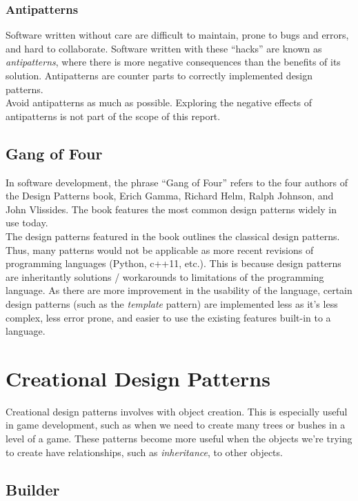 \documentclass[10pt,letterpaper]{article}
\newcommand{\bs}{\bigskip}
\begin{document}
\begin{multicols}{2}
\subsubsection{Antipatterns}
Software written without care are difficult to maintain, prone to bugs and errors, and hard to collaborate. Software written with these ``hacks'' are known as \textit{antipatterns}, where there is more negative consequences than the benefits of its solution. Antipatterns are counter parts to correctly implemented design patterns.\cite{sm-antipatterns}\bs
\\
Avoid antipatterns as much as possible. Exploring the negative effects of antipatterns is not part of the scope of this report.

\subsection{Gang of Four}

In software development, the phrase ``Gang of Four'' refers to the four authors of the Design Patterns book, Erich Gamma, Richard Helm, Ralph Johnson, and John Vlissides\cite{gof-wiki}. The book features the most common design patterns widely in use today.\bs
\\
The design patterns featured in the book outlines the classical design patterns. Thus, many patterns would not be applicable as more recent revisions of programming languages (Python, c++11, etc.). This is because design patterns are inheritantly solutions / workarounds to limitations of the programming language. As there are more improvement in the usability of the language, certain design patterns (such as the \textit{template} pattern) are implemented less as it's less complex, less error prone, and easier to use the existing features built-in to a language.


\section{Creational Design Patterns}

Creational design patterns involves with object creation.\cite{sm-creationaldp} This is especially useful in game development, such as when we need to create many trees or bushes in a level of a game. These patterns become more useful when the objects we're trying to create have relationships, such as \textit{inheritance}, to other objects.

\subsection{Builder}


\end{multicols}
\end{document}
